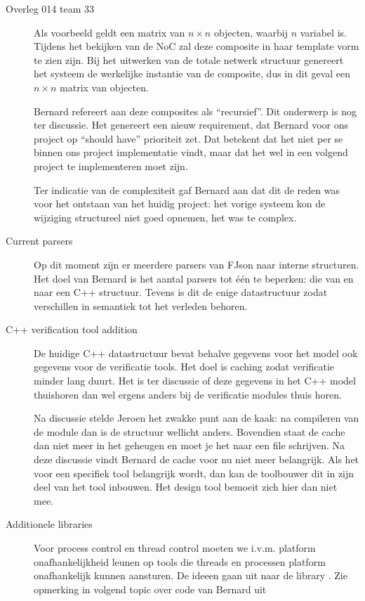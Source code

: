 \documentclass[a4paper,final]{article}
\begin{document}
\begin{Minutes}{Overleg 014 team 33}
\begin{description}
		Als voorbeeld geldt een matrix van $n \times n$ objecten, waarbij $n$
		variabel is. Tijdens het bekijken van de NoC zal deze composite in haar
		template vorm te zien zijn. Bij het uitwerken van de totale netwerk
		structuur genereert het systeem de werkelijke instantie van de
		composite, dus in dit geval een $n \times n$ matrix van objecten.

		Bernard refereert aan deze composites als ``recursief''. Dit onderwerp
		is nog ter discussie. Het genereert een nieuw requirement, dat Bernard
		voor ons project op ``should have'' prioriteit zet. Dat betekent dat
		het niet per se binnen ons project implementatie vindt, maar dat het
		wel in een volgend project te implementeren moet zijn.

		Ter indicatie van de complexiteit gaf Bernard aan dat dit de reden was
		voor het ontstaan van het huidig project: het vorige systeem kon de
		wijziging structureel niet goed opnemen, het was te complex.
		
	\item[Current parsers] Op dit moment zijn er meerdere parsers van FJson
		naar interne structuren. Het doel van Bernard is het aantal parsers tot
		\'e\'en te beperken: die van en naar een C++ structuur. Tevens is dit
		de enige datastructuur zodat verschillen in semantiek tot het verleden
		behoren.

	\item[C++ verification tool addition] De huidige C++ datastructuur bevat
		behalve gegevens voor het model ook gegevens voor de verificatie tools.
		Het doel is caching zodat verificatie minder lang duurt.  Het is ter
		discussie of deze gegevens in het C++ model thuishoren dan wel ergens
		anders bij de verificatie modules thuis horen.  

		Na discussie stelde Jeroen het zwakke punt aan de kaak: na compileren van
		de module dan is de structuur wellicht anders. Bovendien staat de cache
		dan niet meer in het geheugen en moet je het naar een file schrijven.
		Na deze discussie vindt Bernard de cache voor nu niet meer belangrijk.
		Als het voor een specifiek tool belangrijk wordt, dan kan de
		toolbouwer dit in zijn deel van het tool inbouwen. Het design tool
		bemoeit zich hier dan niet mee.

	\item[Additionele libraries] Voor process control en thread control moeten
		we i.v.m. platform onafhankelijkheid leunen op tools die threads en
		processen platform onafhankelijk kunnen aansturen. De ideeen gaan uit
		naar de library . Zie opmerking in volgend topic over code van
		Bernard uit 


\end{description}
\end{Minutes}
\end{document}
